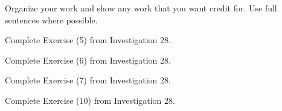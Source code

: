 \documentclass[addpoints]{exam}
\begin{document}
Organize your work and show any work that you want credit for. Use full sentences where possible.

\begin{questions}
\question 
Complete Exercise (5) from Investigation 28.

\question 
Complete Exercise (6) from Investigation 28.


\question 
Complete Exercise (7) from Investigation 28.

\question 
Complete Exercise (10) from Investigation 28.









\end{questions}
\end{document}
